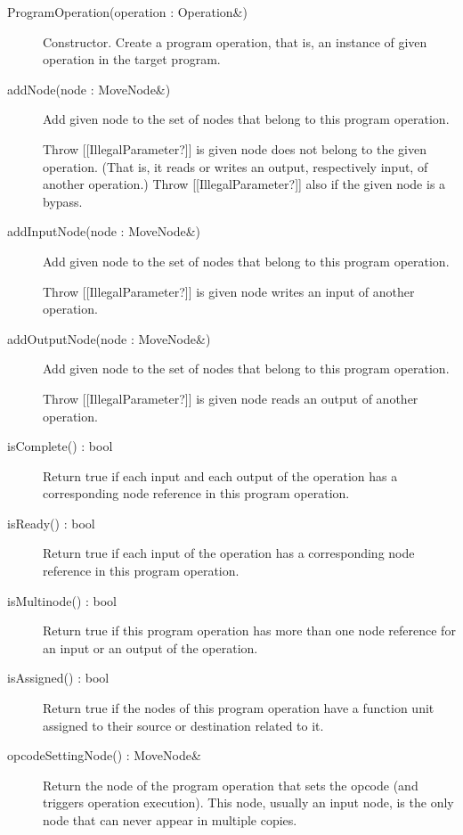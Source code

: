 \documentclass[a4paper,twoside]{tce}
\begin{document}
\begin{description}
\item[ProgramOperation(operation : Operation\&)]%
  Constructor. Create a program operation, that is, an instance of given
  operation in the target program.

\item[addNode(node : MoveNode\&)]%
  Add given node to the set of nodes that belong to this program operation.

  Throw [[IllegalParameter?]] is given node does not belong to the given
  operation. (That is, it reads or writes an output, respectively input, of
  another operation.)
%
  Throw [[IllegalParameter?]] also if the given node is a bypass.

\item[addInputNode(node : MoveNode\&)]%
  Add given node to the set of nodes that belong to this program operation.

  Throw [[IllegalParameter?]] is given node writes an input of another
  operation.

\item[addOutputNode(node : MoveNode\&)]%
  Add given node to the set of nodes that belong to this program operation.

  Throw [[IllegalParameter?]] is given node reads an output of another
  operation.

\item[isComplete() : bool]%
  Return true if each input and each output of the operation has a
  corresponding node reference in this program operation.

\item[isReady() : bool]%
  Return true if each input of the operation has a corresponding node
  reference in this program operation.

\item[isMultinode() : bool]%
  Return true if this program operation has more than one node reference for
  an input or an output of the operation.

\item[isAssigned() : bool]%
  Return true if the nodes of this program operation have a function unit
  assigned to their source or destination related to it.

\item[opcodeSettingNode() : MoveNode\&]%
  Return the node of the program operation that sets the opcode (and
  triggers operation execution). This node, usually an input node, is the
  only node that can never appear in multiple copies.


\end{description}
\end{document}
